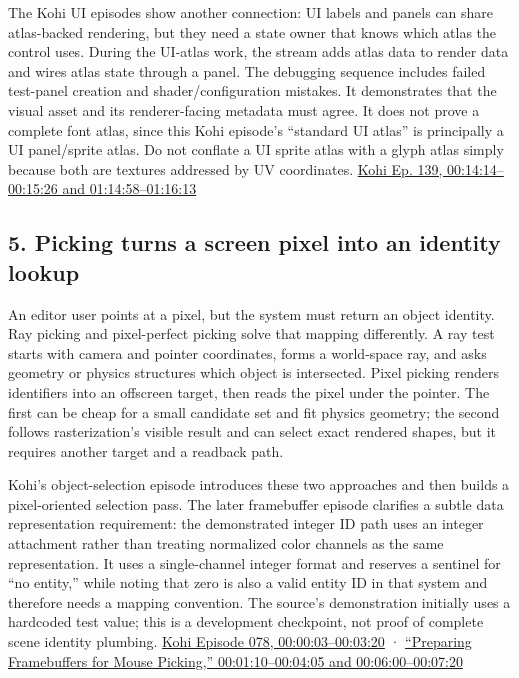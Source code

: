 The Kohi UI episodes show another connection: UI labels and panels can share atlas-backed rendering, but they need a state owner that knows which atlas the control uses. During the UI-atlas work, the stream adds atlas data to render data and wires atlas state through a panel. The debugging sequence includes failed test-panel creation and shader/configuration mistakes. It demonstrates that the visual asset and its renderer-facing metadata must agree. It does not prove a complete font atlas, since this Kohi episode's ``standard UI atlas'' is principally a UI panel/sprite atlas. Do not conflate a UI sprite atlas with a glyph atlas simply because both are textures addressed by UV coordinates. \href{https://www.youtube.com/watch?v=-V5z1bVjl_c&t=14m14s}{Kohi Ep. 139, 00:14:14--00:15:26 and 01:14:58--01:16:13}

\subsection{5. Picking turns a screen pixel into an identity lookup}\label{06-engine-ii-ch041-picking-turns-a-screen-pixel-into-an-identity-lookup}

\hypertarget{06-engine-ii-ch041-picking-turns-a-screen-pixel-into-an-identity-lookup}{}

An editor user points at a pixel, but the system must return an object identity. Ray picking and pixel-perfect picking solve that mapping differently. A ray test starts with camera and pointer coordinates, forms a world-space ray, and asks geometry or physics structures which object is intersected. Pixel picking renders identifiers into an offscreen target, then reads the pixel under the pointer. The first can be cheap for a small candidate set and fit physics geometry; the second follows rasterization's visible result and can select exact rendered shapes, but it requires another target and a readback path.

Kohi's object-selection episode introduces these two approaches and then builds a pixel-oriented selection pass. The later framebuffer episode clarifies a subtle data representation requirement: the demonstrated integer ID path uses an integer attachment rather than treating normalized color channels as the same representation. It uses a single-channel integer format and reserves a sentinel for ``no entity,'' while noting that zero is also a valid entity ID in that system and therefore needs a mapping convention. The source's demonstration initially uses a hardcoded test value; this is a development checkpoint, not proof of complete scene identity plumbing. \href{https://www.youtube.com/watch?v=mx1TyxNFrdo&t=3s}{Kohi Episode 078, 00:00:03--00:03:20} · \href{https://www.youtube.com/watch?v=wYVaIOUhz6s&t=1m10s}{``Preparing Framebuffers for Mouse Picking,'' 00:01:10--00:04:05 and 00:06:00--00:07:20}

